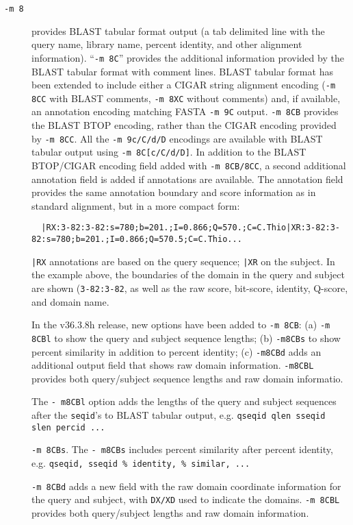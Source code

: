 \documentclass[11pt]{article}
\begin{document}
\begin{description}
\item[\texttt{-m 8}] provides BLAST tabular format output (a tab
  delimited line with the query name, library name, percent identity,
  and other alignment information). ``\texttt{-m 8C}'' provides the
  additional information provided by the BLAST tabular format with
  comment lines.  BLAST tabular format has been extended to include
  either a CIGAR string alignment encoding (\texttt{-m 8CC} with BLAST
  comments, \texttt{-m 8XC} without comments) and, if available, an
  annotation encoding matching FASTA \texttt{-m 9C} output. \texttt{-m
    8CB} provides the BLAST BTOP encoding, rather than the CIGAR
  encoding provided by \texttt{-m 8CC}.  All the \texttt{-m 9c/C/d/D}
  encodings are available with BLAST tabular output using \texttt{-m
    8C[c/C/d/D]}.  In addition to the BLAST BTOP/CIGAR encoding field
  added with \texttt{-m 8CB/8CC}, a second additional annotation field is added if annotations are available. The annotation field provides the same annotation boundary and score information as in standard alignment, but in a more compact form:
\begin{verbatim}
  |RX:3-82:3-82:s=780;b=201.;I=0.866;Q=570.;C=C.Thio|XR:3-82:3-82:s=780;b=201.;I=0.866;Q=570.5;C=C.Thio...
\end{verbatim}
  \texttt{|RX} annotations are based on the query sequence; \texttt{|XR} on the subject. In the example above, the boundaries of the domain in the query and subject are shown (\texttt{3-82:3-82}, as well as the raw score, bit-score, identity, Q-score, and domain name.

  In the v36.3.8h release, 
  new options have been added to \texttt{-m 8CB}: (a) \texttt{-m 8CBl} to show the query and subject sequence lengths;
  (b) \texttt{-m8CBs} to show percent similarity in addition to percent identity; (c) \texttt{-m8CBd} adds an additional output field that shows raw domain information. \texttt{-m8CBL} provides both query/subject sequence lengths and raw domain informatio.

 The \texttt{- m8CBl} option adds the lengths of
  the query and subject sequences after the \texttt{seqid}'s to BLAST
  tabular output, e.g. \texttt{qseqid qlen sseqid slen percid ...}

  \texttt{-m 8CBs}. The \texttt{- m8CBs} includes percent similarity after percent identity,
  e.g. \texttt{qseqid, sseqid \% identity, \% similar, ... }

  \texttt{-m 8CBd} adds a new field with
  the raw domain coordinate information for the query and subject, with \texttt{DX/XD} used to indicate the domains.
  \texttt{-m 8CBL} provides both query/subject lengths and raw domain information.



\end{description}
\end{document}
